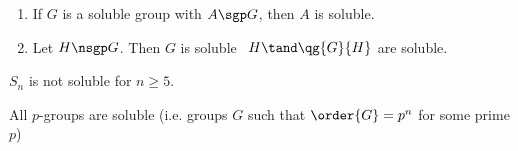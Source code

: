 \documentclass[a4paper]{article}
\begin{document}
\begin{ttheorem}
  \begin{enumerate}
    \item If \( G \) is a soluble group with \( A\sgp G \), then \( A \) is soluble.
    \item Let \( H\nsgp G \). Then \( G \) is soluble \iff~\( H\tand \qg{G}{H} \) are soluble.
  \end{enumerate}
\end{ttheorem}

\begin{tcorollary}
  \( S_n \) is not soluble for \( n\geq 5 \).
\end{tcorollary}

\begin{tcorollary}
  All \( p \)-groups are soluble (i.e. groups \( G \) such that \( \order{G} = p^n \) for some prime \( p \))
\end{tcorollary}
\end{document}
